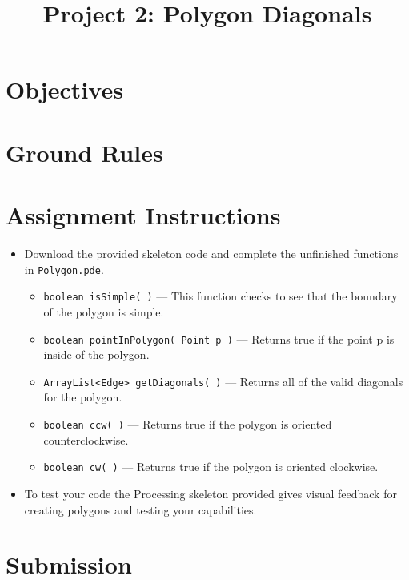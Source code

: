 \documentclass[a4paper,12pt]{article}
\title{Project 2: Polygon Diagonals}
\begin{document}
\maketitle

\section{Objectives}



\vspace{5pt}
\section{Ground Rules}


\vspace{5pt}
\section{Assignment Instructions}

\begin{itemize}

\item Download the provided skeleton code and complete the unfinished functions in \texttt{Polygon.pde}.

\begin{itemize}

   \item \texttt{boolean isSimple( )} --- This function checks to see that the boundary of the polygon is simple.
   
   \item \texttt{boolean pointInPolygon( Point p )} --- Returns true if the point p is inside of the polygon.
   
   \item \texttt{ArrayList<Edge> getDiagonals( )} --- Returns all of the valid diagonals for the polygon.
   
   \item \texttt{boolean ccw( )} --- Returns true if the polygon is oriented counterclockwise.
   
   \item \texttt{boolean cw( )} --- Returns true if the polygon is oriented clockwise.
         
   
\end{itemize}

\item To test your code the Processing skeleton provided gives visual feedback for creating polygons and testing your capabilities.

\end{itemize}


\section{Submission}

\end{document}
